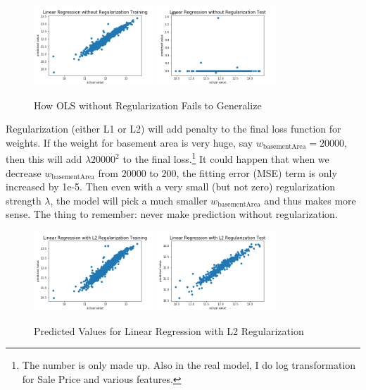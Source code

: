 \documentclass[a4paper]{article}
\begin{document}
\begin{figure}[H]
\centering
\includegraphics[width=0.4\textwidth]{Linear_Regression_without_Regularization_trn.png}
\includegraphics[width=0.4\textwidth]{Linear_Regression_without_Regularization_tst.png}
\caption{How OLS without Regularization Fails to Generalize}
\end{figure}


Regularization (either L1 or L2) will add penalty to the final loss function for weights. If the weight for basement area is very huge, say $w_{\text{basementArea}}=20000$, then this will add $\lambda 20000^2$ to the final loss.\footnote{The number is only made up. Also in the real model, I do log transformation for Sale Price and various features.} It could happen that when we decrease $w_{\text{basementArea}}$ from $20000$ to $200$, the fitting error (MSE) term is only increased by 1e-5. Then even with a very small (but not zero) regularization strength $\lambda$, the model will pick a much smaller $w_{\text{basementArea}}$ and thus makes more sense. The thing to remember: never make prediction without regularization.

\begin{figure}[H]
\centering
\includegraphics[width=0.4\textwidth]{Linear_Regression_with_L2_Regularization_trn.png}
\includegraphics[width=0.4\textwidth]{Linear_Regression_with_L2_Regularization_tst.png}
\caption{Predicted Values for Linear Regression with L2 Regularization}
\end{figure}
\end{document}
